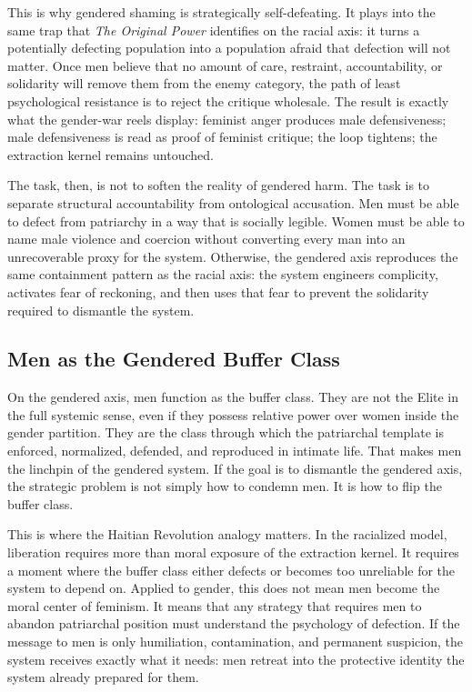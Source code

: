 \documentclass[12pt]{article}
\newcommand{\OP}{\textit{The Original Power}}
\begin{document}
This is why gendered shaming is strategically self-defeating. It plays into the same trap that \OP{} identifies on the racial axis: it turns a potentially defecting population into a population afraid that defection will not matter. Once men believe that no amount of care, restraint, accountability, or solidarity will remove them from the enemy category, the path of least psychological resistance is to reject the critique wholesale. The result is exactly what the gender-war reels display: feminist anger produces male defensiveness; male defensiveness is read as proof of feminist critique; the loop tightens; the extraction kernel remains untouched.

The task, then, is not to soften the reality of gendered harm. The task is to separate structural accountability from ontological accusation. Men must be able to defect from patriarchy in a way that is socially legible. Women must be able to name male violence and coercion without converting every man into an unrecoverable proxy for the system. Otherwise, the gendered axis reproduces the same containment pattern as the racial axis: the system engineers complicity, activates fear of reckoning, and then uses that fear to prevent the solidarity required to dismantle the system.

\subsection{Men as the Gendered Buffer Class}

On the gendered axis, men function as the buffer class. They are not the Elite in the full systemic sense, even if they possess relative power over women inside the gender partition. They are the class through which the patriarchal template is enforced, normalized, defended, and reproduced in intimate life. That makes men the linchpin of the gendered system. If the goal is to dismantle the gendered axis, the strategic problem is not simply how to condemn men. It is how to flip the buffer class.

This is where the Haitian Revolution analogy matters. In the racialized model, liberation requires more than moral exposure of the extraction kernel. It requires a moment where the buffer class either defects or becomes too unreliable for the system to depend on. Applied to gender, this does not mean men become the moral center of feminism. It means that any strategy that requires men to abandon patriarchal position must understand the psychology of defection. If the message to men is only humiliation, contamination, and permanent suspicion, the system receives exactly what it needs: men retreat into the protective identity the system already prepared for them.
\end{document}
